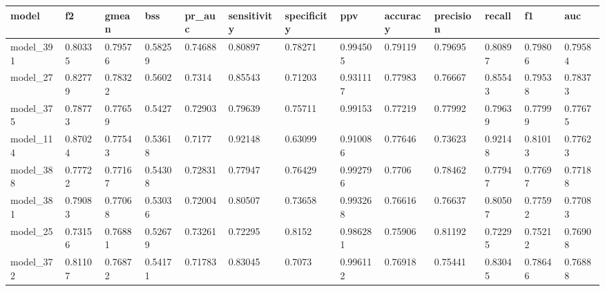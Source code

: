 \begin{tabular}{|l|l|l|l|l|l|l|l|l|l|l|l|l|}
\hline
\textbf{model} & \textbf{f2} & \textbf{gmean} & \textbf{bss} & \textbf{pr\_auc} & \textbf{sensitivity} & \textbf{specificity} & \textbf{ppv} & \textbf{accuracy} & \textbf{precision} & \textbf{recall} & \textbf{f1} & \textbf{auc} \\ \hline
model\_391     & 0.80335     & 0.79576        & 0.58259      & 0.74688          & 0.80897              & 0.78271              & 0.994505     & 0.79119           & 0.79695            & 0.80897         & 0.79806     & 0.79584      \\ \hline
model\_27      & 0.82779     & 0.78322        & 0.5602       & 0.7314           & 0.85543              & 0.71203              & 0.931117     & 0.77983           & 0.76667            & 0.85543         & 0.79538     & 0.78373      \\ \hline
model\_375     & 0.78773     & 0.77659        & 0.5427       & 0.72903          & 0.79639              & 0.75711              & 0.99153      & 0.77219           & 0.77992            & 0.79639         & 0.77999     & 0.77675      \\ \hline
model\_114     & 0.87024     & 0.77543        & 0.53618      & 0.7177           & 0.92148              & 0.63099              & 0.910086     & 0.77646           & 0.73623            & 0.92148         & 0.81013     & 0.77623      \\ \hline
model\_388     & 0.77722     & 0.77167        & 0.54308      & 0.72831          & 0.77947              & 0.76429              & 0.992796     & 0.7706            & 0.78462            & 0.77947         & 0.77697     & 0.77188      \\ \hline
model\_381     & 0.79083     & 0.77068        & 0.53036      & 0.72004          & 0.80507              & 0.73658              & 0.993268     & 0.76616           & 0.76637            & 0.80507         & 0.77592     & 0.77083      \\ \hline
model\_25      & 0.73156     & 0.76881        & 0.52679      & 0.73261          & 0.72295              & 0.8152               & 0.986281     & 0.75906           & 0.81192            & 0.72295         & 0.75212     & 0.76908      \\ \hline
model\_372     & 0.81107     & 0.76872        & 0.54171      & 0.71783          & 0.83045              & 0.7073               & 0.996112     & 0.76918           & 0.75441            & 0.83045         & 0.78646     & 0.76888      \\ \hline

\end{tabular}
